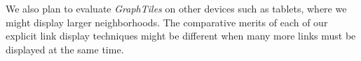 \documentclass{sigchi}
\begin{document}
We also plan to evaluate \textit{GraphTiles} on other devices such as tablets, where we might display larger neighborhoods. The comparative merits of each of our explicit link display techniques might be different when many more links must be displayed at the same time.


%
%
%
%
%



\end{document}
